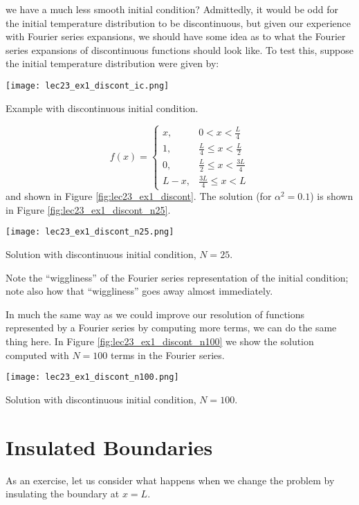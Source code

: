  we have a much less smooth initial condition?  Admittedly, it would be odd for the initial temperature distribution to be discontinuous, but given our experience with Fourier series expansions, we should have some idea as to what the Fourier series expansions of discontinuous functions should look like.  To test this, suppose the initial temperature distribution were given by:
\begin{marginfigure}
\texttt{[image: lec23\_ex1\_discont\_ic.png]}
\caption{Example with discontinuous initial condition.}
\label{fig:lec23_ex1_discont}
\end{marginfigure}
\begin{equation*}
f(x) = 
\begin{cases}
x, & 0 < x < \frac{L}{4} \\
1, & \frac{L}{4} \le x < \frac{L}{2} \\
0, & \frac{L}{2} \le x < \frac{3L}{4} \\
L-x, & \frac{3L}{4} \le x < L

\end{cases}
\end{equation*}
and shown in Figure \ref{fig:lec23_ex1_discont}. The solution (for $\alpha^2=0.1$) is shown in Figure \ref{fig:lec23_ex1_discont_n25}. 
\begin{marginfigure} 
\texttt{[image: lec23\_ex1\_discont\_n25.png]}
\caption{Solution with discontinuous initial condition, $N=25$.}
\label{fig:lec23_ex1_discont_n25}
\end{marginfigure} 
Note the ``wiggliness'' of the Fourier series representation of the initial condition; note also how that ``wiggliness'' goes away almost immediately.

In much the same way as we could improve our resolution of functions represented by a Fourier series by computing more terms, we can do the same thing here.  In Figure \ref{fig:lec23_ex1_discont_n100} we show the solution computed with $N=100$ terms in the Fourier series.
\begin{marginfigure}
\texttt{[image: lec23\_ex1\_discont\_n100.png]}
\caption{Solution with discontinuous initial condition, $N=100$.}
\label{fig:lec23_ex1_discont_n100}
\end{marginfigure}

\section{Insulated Boundaries}
As an exercise, let us consider what happens when we change the problem by insulating the boundary at $x=L$.  

